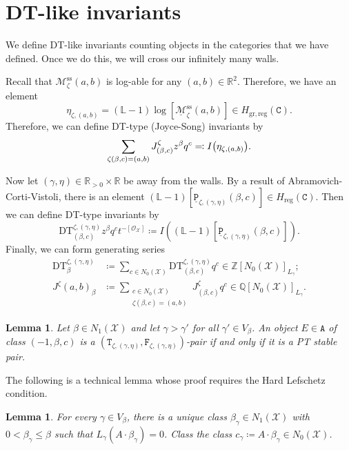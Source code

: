 \documentclass{amsart}
\newtheorem{lem}[thm]{Lemma}
\theoremstyle{definition}
\theoremstyle{remark}
\theoremstyle{plain}
\theoremstyle{definition}
\theoremstyle{remark}
\newcommand{\R}{\mathbb{R}}
\newcommand{\Z}{\mathbb{Z}}
\newcommand{\Q}{\mathbb{Q}}
\renewcommand{\L}{\mathbb{L}}
\newcommand{\mc}[1]{\mathcal{#1}}
\newcommand{\mr}[1]{\mathrm{#1}}
\newcommand{\mt}[1]{\mathtt{#1}}
\newcommand{\ul}[1]{\underline{#1}}
\newcommand{\1}{\mathbf{1}}
\newcommand{\2}{\mathbf{2}}
\newcommand{\3}{\mathbf{3}}
\begin{document}
\section{DT-like invariants}

We define DT-like invariants counting objects in the categories that we have defined. Once we do this, we will cross our infinitely many walls.

Recall that $\mc{M}_{\zeta}^{\mr{ss}}(a, b)$ is log-able for any $(a, b) \in \R^2$. Therefore, we have an element
\[ \eta_{\zeta, (a,b)} = (\L-1) \log [\ul{\mc{M}}_{\zeta}^{\mr{ss}}(a,b)] \in H_{\mr{gr, reg}}(\mt{C}). \]
Therefore, we can define DT-type (Joyce-Song) invariants by
\[ \sum_{\zeta(\beta, c) = (a,b)} J_{(\beta,c)}^{\zeta} z^{\beta} q^c \eqqcolon I\qty(\eta_{\zeta,(a,b)}). \]

Now let $(\gamma, \eta) \in \R_{>0} \times \R$ be away from the walls. By a result of Abramovich-Corti-Vistoli, there is an element $(\L-1)[\mt{\ul{P}}_{\zeta,(\gamma,\eta)}(\beta, c)] \in H_{\mr{reg}}(\mt{C})$. Then we can define DT-type invariants by
\[ \mr{DT}_{(\beta,c)}^{\zeta,(\gamma,\eta)}z^{\beta} q^c t^{-[\mc{O}_{\mc{X}}]} \coloneqq I((\L-1)[\mt{\ul{P}}_{\zeta,(\gamma,\eta)}(\beta,c)]). \]
Finally, we can form generating series 
\begin{align*} 
    \mr{DT}_{\beta}^{\zeta, (\gamma,\eta)} &\coloneqq \sum_{c \in N_0(\mc{X})} \mr{DT}_{(\beta,c)}^{\zeta,(\gamma,\eta)} q^c \in \Z[N_0(\mc{X})]_{L_{\gamma}}; \\ 
    J^{\zeta}(a,b)_{\beta} &\coloneqq \sum_{\substack{c \in N_0(\mc{X}) \\ \zeta(\beta,c) = (a,b)}} J^{\zeta}_{(\beta,c)} q^c \in \Q[N_0(\mc{X})]_{L_{\gamma}}. 
\end{align*}

\begin{lem}
    Let $\beta \in N_1(\mc{X})$ and let $\gamma > \gamma'$ for all $\gamma' \in V_{\beta}$. An object $E \in \mt{A}$ of class $(-1, \beta, c)$ is a $(\mt{T}_{\zeta, (\gamma,\eta)}, \mt{F}_{\zeta, (\gamma, \eta)})$-pair if and only if it is a PT stable pair.
\end{lem}

The following is a technical lemma whose proof requires the Hard Lefschetz condition.
\begin{lem}
    For every $\gamma \in V_{\beta}$, there is a unique class $\beta_{\gamma} \in N_1(\mc{X})$ with $0 < \beta_{\gamma} \leq \beta$ such that $L_{\gamma}(A \cdot \beta_{\gamma}) = 0$. Class the class $c_{\gamma} \coloneqq A \cdot \beta_{\gamma} \in N_0(\mc{X})$.
\end{lem}
\end{document}
